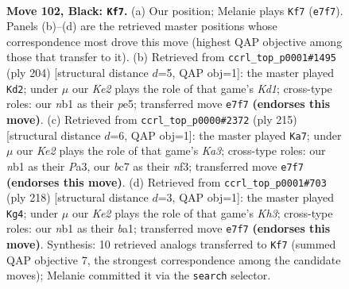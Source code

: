 \documentclass[11pt]{article}
\begin{document}
\clearpage

\begin{figure}[p]\centering
\begin{subfigure}{0.46\textwidth}\centering
\resizebox{\linewidth}{!}{%
\newchessgame
\chessboard[
  setfen={8/2B1k3/8/8/p1p3b1/8/5K2/1N6 b - - 59 102},
  showmover=false,
  pgfstyle=straightmove, color=movearrow, markmove={e7-f7}
]}
\caption{}
\end{subfigure}\hfill
\begin{subfigure}{0.46\textwidth}\centering
\resizebox{\linewidth}{!}{%
\newchessgame
\chessboard[
  setfen={4k3/8/8/4p3/8/5P2/B4b2/3K4 w - - 27 103},
  showmover=false,
  pgfstyle=straightmove, color=movearrow, markmove={d1-d2}
]}
\caption{}
\end{subfigure}
\\[4pt]
\begin{subfigure}{0.46\textwidth}\centering
\resizebox{\linewidth}{!}{%
\newchessgame
\chessboard[
  setfen={8/6b1/k7/8/2K5/p4N2/P7/8 b - - 73 108},
  showmover=false,
  pgfstyle=straightmove, color=movearrow, markmove={a6-a7}
]}
\caption{}
\end{subfigure}\hfill
\begin{subfigure}{0.46\textwidth}\centering
\resizebox{\linewidth}{!}{%
\newchessgame
\chessboard[
  setfen={5k2/8/2B5/5PP1/8/7K/8/b7 w - - 69 110},
  showmover=false,
  pgfstyle=straightmove, color=movearrow, markmove={h3-g4}
]}
\caption{}
\end{subfigure}
\caption{\textbf{Move 102, Black: \texttt{Kf7}.} (a) Our position; Melanie plays \texttt{Kf7} (\texttt{e7f7}). Panels (b)--(d) are the retrieved master positions whose correspondence most drove this move (highest QAP objective among those that transfer to it). (b) Retrieved from \texttt{ccrl\_top\_p0001\#1495} (ply 204) [structural distance $d$=5, QAP obj=1]: the master played \texttt{Kd2}; under $\mu$ our \emph{Ke2} plays the role of that game's \emph{Kd1}; cross-type roles: our \emph{n}b1 as their \emph{p}e5; transferred move \texttt{e7f7} \textbf{(endorses this move)}. (c) Retrieved from \texttt{ccrl\_top\_p0000\#2372} (ply 215) [structural distance $d$=6, QAP obj=1]: the master played \texttt{Ka7}; under $\mu$ our \emph{Ke2} plays the role of that game's \emph{Ka3}; cross-type roles: our \emph{n}b1 as their \emph{P}a3, our \emph{b}c7 as their \emph{n}f3; transferred move \texttt{e7f7} \textbf{(endorses this move)}. (d) Retrieved from \texttt{ccrl\_top\_p0001\#703} (ply 218) [structural distance $d$=3, QAP obj=1]: the master played \texttt{Kg4}; under $\mu$ our \emph{Ke2} plays the role of that game's \emph{Kh3}; cross-type roles: our \emph{n}b1 as their \emph{b}a1; transferred move \texttt{e7f7} \textbf{(endorses this move)}. Synthesis: 10 retrieved analogs transferred to \texttt{Kf7} (summed QAP objective 7, the strongest correspondence among the candidate moves); Melanie committed it via the \texttt{search} selector.}
\label{fig:thought-m203}
\end{figure}
\end{document}
